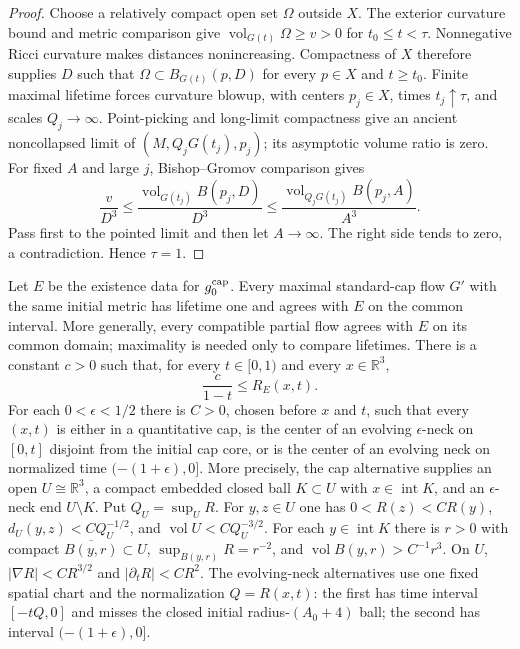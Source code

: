 \begin{proof}
Choose a relatively compact open set $\Omega$ outside $X$.  The exterior
curvature bound and metric comparison give
$\operatorname{vol}_{G(t)}\Omega\geq v>0$ for $t_0\leq t<\tau$.
Nonnegative Ricci curvature makes distances nonincreasing.  Compactness
of $X$ therefore supplies $D$ such that
$\Omega\subset B_{G(t)}(p,D)$ for every $p\in X$ and $t\geq t_0$.
Finite maximal lifetime forces curvature blowup, with centers
$p_j\in X$, times $t_j\uparrow\tau$, and scales $Q_j\to\infty$.
Point-picking and long-limit compactness give an ancient noncollapsed
limit of $(M,Q_jG(t_j),p_j)$; its asymptotic volume ratio is zero.
For fixed $A$ and large $j$, Bishop--Gromov comparison gives
\[
 \frac{v}{D^3}\leq
 \frac{\operatorname{vol}_{G(t_j)}B(p_j,D)}{D^3}
 \leq\frac{\operatorname{vol}_{Q_jG(t_j)}B(p_j,A)}{A^3}.
\]
Pass first to the pointed limit and then let $A\to\infty$.
The right side tends to zero, a contradiction.  Hence $\tau=1$.
\end{proof}

\begin{theorem}
\label{thm:standard-cap-uniqueness}
Let $E$ be the existence data for $g_0^{\rm cap}$.  Every maximal standard-cap
flow $G'$ with the same initial metric has lifetime one and agrees with $E$ on
the common interval.  More generally, every compatible partial flow agrees
with $E$ on its common domain; maximality is needed only to compare lifetimes.
There is a constant $c>0$ such that, for every $t\in[0,1)$ and every
$x\in\mathbb R^3$,
\[
             \frac{c}{1-t}\leq R_E(x,t).
\]
For each $0<\epsilon<1/2$ there is $C>0$, chosen before $x$ and $t$, such
that every $(x,t)$ is either in a quantitative cap, is the center of an
evolving $\epsilon$-neck on $[0,t]$ disjoint from the initial cap core, or is
the center of an evolving neck on normalized time $(-(1+\epsilon),0]$.
More precisely, the cap alternative supplies an open $U\cong\mathbb R^3$,
a compact embedded closed ball $K\subset U$ with $x\in\operatorname{int}K$,
and an $\epsilon$-neck end $U\setminus K$.  Put $Q_U=\sup_U R$.
For $y,z\in U$ one has $0<R(z)<CR(y)$,
$d_U(y,z)<CQ_U^{-1/2}$, and
$\operatorname{vol}U<CQ_U^{-3/2}$.
For each $y\in\operatorname{int}K$ there is $r>0$ with compact
$\overline{B(y,r)}\subset U$, $\sup_{B(y,r)}R=r^{-2}$, and
$\operatorname{vol}B(y,r)>C^{-1}r^3$.
On $U$, $|\nabla R|<CR^{3/2}$ and $|\partial_tR|<CR^2$.
The evolving-neck alternatives use one fixed spatial chart and the
normalization $Q=R(x,t)$: the first has time interval $[-tQ,0]$
and misses the closed initial radius-$(A_0+4)$ ball; the second has
interval $(-(1+\epsilon),0]$.
\cite[Proposition 12.31 and Theorem 12.32, pp. 325--327]{MT2007}
\end{theorem}

